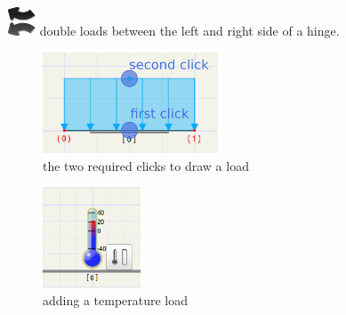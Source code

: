 \documentclass[a4paper,11pt]{report}
\begin{document}
\begin{minipage}[h]{\textwidth-4cm}
\begin{trivlist}
	\item[] \includegraphics[scale = 0.5]{../../icons/doubleL.png} double loads between the left and right side of a hinge.
\end{trivlist}
\end{minipage}

\begin{minipage}[b]{\textwidth/2}
\begin{figure}[H]
\begin{center}
\includegraphics[height=3cm]{../pictures/drawload_overlay.png}
\caption{the two required clicks to draw a load}
\label{pic:drawload}
\end{center}
\end{figure}
\end{minipage}
\begin{minipage}[b]{\textwidth/2}
\begin{figure}[H]
\begin{center}
\includegraphics[height=3cm]{../pictures/temp_wid.png}
\caption{adding a temperature load}
\label{pic:tempwidget}
\end{center}
\end{figure}
\end{minipage}
\end{document}
